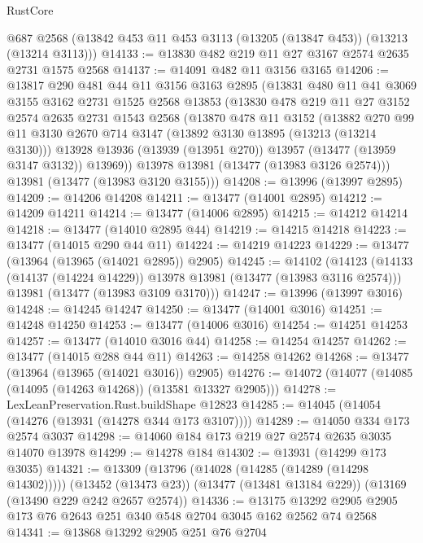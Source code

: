 \begin{lexlean}{RustCore}
\begin{coremodule}
    @687
    @2568
    (@13842 @453 @11 @453 @3113 (@13205 (@13847 @453)) (@13213 (@13214 @3113)))
@14133 := @13830 @482 @219 @11 @27 @3167 @2574 @2635 @2731 @1575 @2568
@14137 := @14091 @482 @11 @3156 @3165
@14206 := @13817
    @290
    @481
    @44
    @11
    @3156
    @3163
    @2895
    (@13831
      @480
      @11
      @41
      @3069
      @3155
      @3162
      @2731
      @1525
      @2568
      @13853
      (@13830
        @478
        @219
        @11
        @27
        @3152
        @2574
        @2635
        @2731
        @1543
        @2568
        (@13870
          @478
          @11
          @3152
          (@13882
            @270
            @99
            @11
            @3130
            @2670
            @714
            @3147
            (@13892 @3130 @13895 (@13213 (@13214 @3130)))
            @13928
            @13936
            (@13939 (@13951 @270))
            @13957
            (@13477 (@13959 @3147 @3132))
            @13969))
        @13978
        @13981
        (@13477 (@13983 @3126 @2574)))
      @13981
      (@13477 (@13983 @3120 @3155)))
@14208 := @13996 (@13997 @2895)
@14209 := @14206 @14208
@14211 := @13477 (@14001 @2895)
@14212 := @14209 @14211
@14214 := @13477 (@14006 @2895)
@14215 := @14212 @14214
@14218 := @13477 (@14010 @2895 @44)
@14219 := @14215 @14218
@14223 := @13477 (@14015 @290 @44 @11)
@14224 := @14219 @14223
@14229 := @13477 (@13964 (@13965 (@14021 @2895)) @2905)
@14245 := @14102
    (@14123
      (@14133 (@14137 (@14224 @14229)) @13978 @13981 (@13477 (@13983 @3116 @2574)))
      @13981
      (@13477 (@13983 @3109 @3170)))
@14247 := @13996 (@13997 @3016)
@14248 := @14245 @14247
@14250 := @13477 (@14001 @3016)
@14251 := @14248 @14250
@14253 := @13477 (@14006 @3016)
@14254 := @14251 @14253
@14257 := @13477 (@14010 @3016 @44)
@14258 := @14254 @14257
@14262 := @13477 (@14015 @288 @44 @11)
@14263 := @14258 @14262
@14268 := @13477 (@13964 (@13965 (@14021 @3016)) @2905)
@14276 := @14072 (@14077 (@14085 (@14095 (@14263 @14268)) (@13581 @13327 @2905)))
@14278 := LexLeanPreservation.Rust.buildShape @12823
@14285 := @14045 (@14054 (@14276 (@13931 (@14278 @344 @173 @3107))))
@14289 := @14050 @334 @173 @2574 @3037
@14298 := @14060 @184 @173 @219 @27 @2574 @2635 @3035 @14070 @13978
@14299 := @14278 @184
@14302 := @13931 (@14299 @173 @3035)
@14321 := @13309
    (@13796 (@14028 (@14285 (@14289 (@14298 @14302)))))
    (@13452 (@13473 @23))
    (@13477 (@13481 @13184 @229))
    (@13169 (@13490 @229 @242 @2657 @2574))
@14336 := @13175 @13292 @2905 @2905 @173 @76 @2643 @251 @340 @548 @2704 @3045 @162 @2562 @74 @2568
@14341 := @13868 @13292 @2905 @251 @76 @2704

\end{coremodule}
\end{lexlean}
